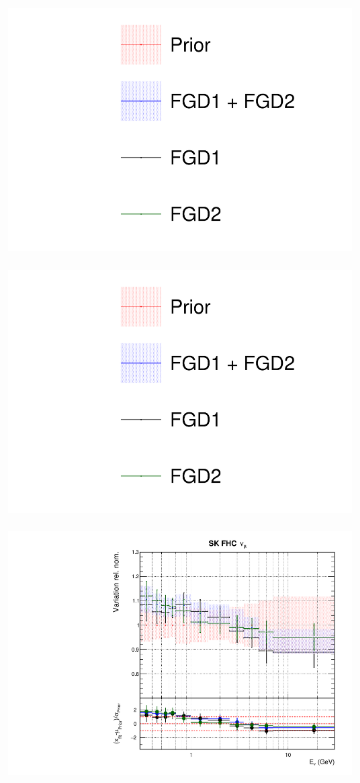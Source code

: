 \begin{figure}
\centering
\begin{subfigure}{0.3\textwidth}
  \centering
  \includegraphics[width=1.0\linewidth, trim={5mm  90mm 0mm 0mm}, clip]{figs/fgdfits_leg}
\end{subfigure}
\begin{subfigure}{0.3\textwidth}
  \centering
  \includegraphics[width=1.0\linewidth, trim={5mm  0mm 0mm 95mm}, clip]{figs/fgdfits_leg}
\end{subfigure}
\begin{subfigure}{0.45\textwidth}
  \centering
  \includegraphics[width=0.75\linewidth]{figs/fgdfitsflux_8}

\end{subfigure}
\end{figure}
